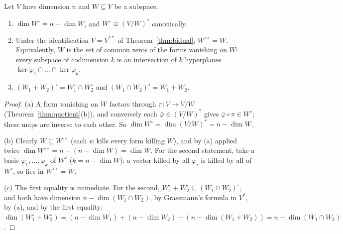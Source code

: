 \begin{theorem}[annihilators]\label{thm:annihilator}
Let $V$ have dimension $n$ and $W\subseteq V$ be a subspace.
\begin{enumerate}[label=(\alph*)]
\item $\dim W^\circ=n-\dim W$, and $W^\circ\cong(V/W)^*$ canonically.
\item Under the identification $V=V^{**}$ of Theorem~\ref{thm:bidual}, $W^{\circ\circ}=W$. Equivalently, $W$ is the set of
common zeros of the forms vanishing on $W$: every subspace of codimension $k$ is an intersection of $k$ hyperplanes
$\ker\varphi_1\cap\dots\cap\ker\varphi_k$.
\item $(W_1+W_2)^\circ=W_1^\circ\cap W_2^\circ$ and $(W_1\cap W_2)^\circ=W_1^\circ+W_2^\circ$.
\end{enumerate}
\end{theorem}
\begin{proof}
(a) A form vanishing on $W$ factors through $\pi:V\to V/W$ (Theorem~\ref{thm:quotient}(b)), and conversely each
$\bar\varphi\in(V/W)^*$ gives $\bar\varphi\circ\pi\in W^\circ$; these maps are inverse to each other. So
$\dim W^\circ=\dim(V/W)^*=n-\dim W$.

(b) Clearly $W\subseteq W^{\circ\circ}$ (each $w$ kills every form killing $W$), and by (a) applied twice
$\dim W^{\circ\circ}=n-(n-\dim W)=\dim W$. For the second statement, take a basis $\varphi_1,\dots,\varphi_k$ of
$W^\circ$ ($k=n-\dim W$): a vector killed by all $\varphi_i$ is killed by all of $W^\circ$, so lies in $W^{\circ\circ}=W$.

(c) The first equality is immediate. For the second, $W_1^\circ+W_2^\circ\subseteq(W_1\cap W_2)^\circ$, and both have
dimension $n-\dim(W_1\cap W_2)$, by Grassmann's formula in $V^*$, by (a), and by the first equality:
$\dim(W_1^\circ+W_2^\circ)=(n-\dim W_1)+(n-\dim W_2)-(n-\dim(W_1+W_2))=n-\dim(W_1\cap W_2)$.
\end{proof}

